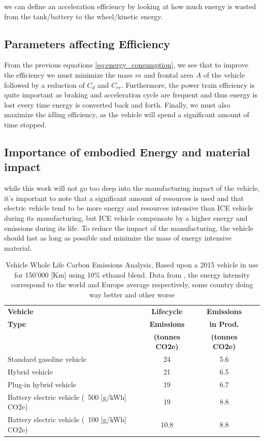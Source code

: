 we can define an acceleration efficiency by looking at how much energy is wasted from the tank/battery to the wheel/kinetic energy.

\subsection{Parameters affecting Efficiency}

From the previous equations \eqref{eq:energy_consumption}, we see that to improve the efficiency we must minimize the mass $m$ and frontal area $A$ of the vehicle followed by a reduction of $C_d$ and $C_{rr}$. Furthermore, the power train efficiency is quite important as braking and acceleration cycle are frequent and thus energy is lost every time energy is converted back and forth. Finally, we must also maximize the idling efficiency, as the vehicle will spend a significant amount of time stopped.

\subsection{Importance of embodied Energy and material impact}

while this work will not go too deep into the manufacturing impact of the vehicle, it's important to note that a significant amount of resources is used and that electric vehicle tend to be more energy and resources intensive than ICE vehicle during its manufacturing, but ICE vehicle compensate by a higher energy and emissions during its life. To reduce the impact of the manufacturing, the vehicle should last as long as possible and minimize the mass of energy intensive material.

\begin{table}[h]
    \centering
    \begin{tabular}{lccc}
        \toprule
        \textbf{Vehicle} & \textbf{Lifecycle} & \textbf{Emissions} \\
        \textbf{Type} & \textbf{Emissions} & \textbf{in Prod.} \\
        & \textbf{(tonnes CO2e)} & \textbf{(tonnes CO2e)} \\
        \midrule
        Standard gasoline vehicle & 24  & 5.6 \\
        Hybrid vehicle            & 21  & 6.5 \\
        Plug-in hybrid vehicle    & 19  & 6.7 \\
        Battery electric vehicle (~500 [g/kWh] CO2e)  & 19  & 8.8 \\
        Battery electric vehicle (~100 [g/kWh] CO2e)  & 10.8 & 8.8 \\
        \bottomrule
    \end{tabular}
    \caption{Vehicle Whole Life Carbon Emissions Analysis, Based upon a 2015 vehicle in use for 150'000 [Km] using 10\% ethanol blend. Data from \cite{noauthor_zemo2025lifecycle_nodate}, the energy intensity correspond to the world and Europe average respectively, some country doing way better and other worse \cite{noauthor_power_nodate}}
    \label{tab:carbon_emissions}
\end{table}

